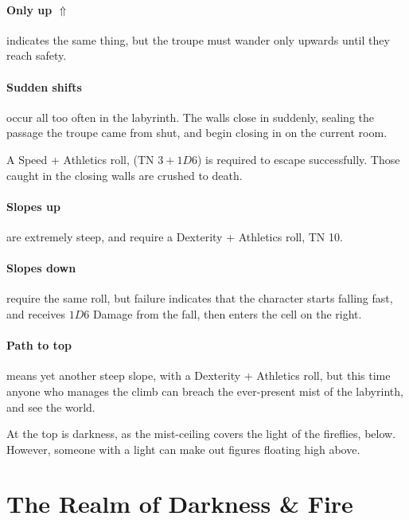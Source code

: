 \begin{multicols}{2}
\paragraph{Only up $\Uparrow$}
indicates the same thing, but the troupe must wander only upwards until they reach safety.

\paragraph{Sudden shifts}
occur all too often in the labyrinth.
The walls close in suddenly, sealing the passage the troupe came from shut, and begin closing in on the current room.

A Speed + Athletics roll, (TN $3 + 1D6$)
is required to escape successfully.
Those caught in the closing walls are crushed to death.

\paragraph{Slopes up}
are extremely steep, and require a Dexterity + Athletics roll, TN 10.

\paragraph{Slopes down}
require the same roll, but failure indicates that the character starts falling fast, and receives $1D6$ Damage from the fall, then enters the cell on the right.

\paragraph{Path to top}
means yet another steep slope, with a Dexterity + Athletics roll, but this time anyone who manages the climb can breach the ever-present mist of the labyrinth, and see the world.

At the top is darkness, as the mist-ceiling covers the light of the fireflies, below.
However, someone with a light can make out figures floating high above.

\jelly

\umberhulk

\archmage

\end{multicols}


\section{The Realm of Darkness \& Fire}\label{darknessandfire}

